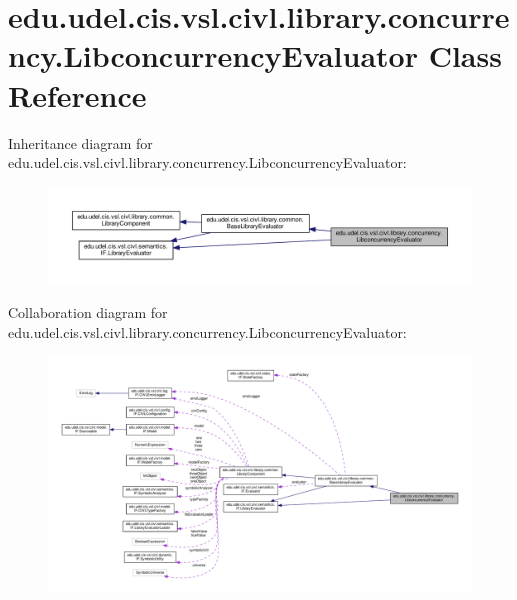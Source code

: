 \hypertarget{classedu_1_1udel_1_1cis_1_1vsl_1_1civl_1_1library_1_1concurrency_1_1LibconcurrencyEvaluator}{}\section{edu.\+udel.\+cis.\+vsl.\+civl.\+library.\+concurrency.\+Libconcurrency\+Evaluator Class Reference}
\label{classedu_1_1udel_1_1cis_1_1vsl_1_1civl_1_1library_1_1concurrency_1_1LibconcurrencyEvaluator}


Inheritance diagram for edu.\+udel.\+cis.\+vsl.\+civl.\+library.\+concurrency.\+Libconcurrency\+Evaluator\+:
\nopagebreak
\begin{figure}[H]
\begin{center}
\leavevmode
\includegraphics[width=350pt]{classedu_1_1udel_1_1cis_1_1vsl_1_1civl_1_1library_1_1concurrency_1_1LibconcurrencyEvaluator__inherit__graph}
\end{center}
\end{figure}


Collaboration diagram for edu.\+udel.\+cis.\+vsl.\+civl.\+library.\+concurrency.\+Libconcurrency\+Evaluator\+:
\nopagebreak
\begin{figure}[H]
\begin{center}
\leavevmode
\includegraphics[width=350pt]{classedu_1_1udel_1_1cis_1_1vsl_1_1civl_1_1library_1_1concurrency_1_1LibconcurrencyEvaluator__coll__graph}
\end{center}
\end{figure}
